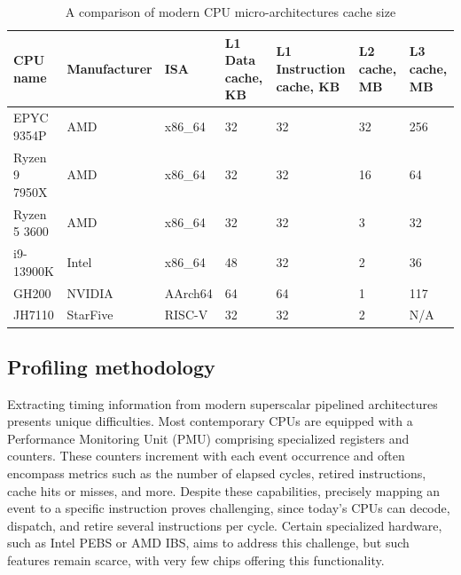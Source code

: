 \begin{table}[!t]
        \renewcommand{\arraystretch}{1.3}
        \caption{A comparison of modern CPU micro-architectures cache size}
        \centering
	\begin{tabular}{lllllll}
	        \hline
		CPU name      & Manufacturer & ISA     & L1 Data cache, KB                        & L1 Instruction cache, KB & L2 cache, MB & L3 cache, MB \\
		\hline
		EPYC 9354P    & AMD          & x86\_64 & 32                                       & 32                       & 32           & 256          \\
		Ryzen 9 7950X & AMD          & x86\_64 & 32                                       & 32                       & 16           & 64           \\
		Ryzen 5 3600  & AMD          & x86\_64 & 32                                       & 32                       & 3            & 32           \\
		i9-13900K     & Intel        & x86\_64 & 48                                       & 32                       & 2            & 36           \\
		GH200         & NVIDIA       & AArch64 & 64                                       & 64                       & 1            & 117          \\
		JH7110        & StarFive     & RISC-V  & 32                                       & 32                       & 2            & N/A
	\end{tabular}
        \label{tab:caches}
\end{table}

\subsection{Profiling methodology}

Extracting timing information from modern superscalar pipelined architectures presents unique difficulties. Most contemporary CPUs are equipped with a Performance Monitoring Unit (PMU) comprising specialized registers and counters. These counters increment with each event occurrence and often encompass metrics such as the number of elapsed cycles, retired instructions, cache hits or misses, and more. Despite these capabilities, precisely mapping an event to a specific instruction proves challenging, since today's CPUs can decode, dispatch, and retire several instructions per cycle. Certain specialized hardware, such as Intel PEBS or AMD IBS, aims to address this challenge, but such features remain scarce, with very few chips offering this functionality\cite{bakhvalovPerformanceAnalysisTuning2020}.

